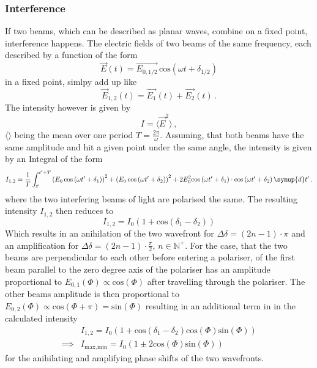 \subsubsection{Interference}
If two beams, which can be described as planar waves, combine on a fixed point, interference happens. The electric fields of two beams of the same frequency, each described by a function of the form 
\begin{equation}
    \vec{E}\left( t\right) = \vec{E_{0,1/2}} \, \text{cos} \left(\omega t + \delta_{1/2}\right)
\end{equation}
in a fixed point, simlpy add up like
\begin{equation}
    \vec{E}_{1,2}\left( t\right) = \vec{E_{1}}\left( t\right) + \vec{E_{2}}\left( t\right) \, .
\end{equation}
The intensity however is given by 
\begin{equation}
    I = \langle \vec{E}^2 \rangle \, ,
\end{equation}
$\langle \rangle$ being the mean over one period $T = \frac{2 \pi}{\omega}$. Assuming, that both beams have the same amplitude and hit a given point under the same angle, the intensity is given by an Integral of the form
\begin{equation}
    I_{1,2} = \frac{1}{T} \int_{t'}^{t' + T} \left( E_0 \, \text{cos}\left( \omega t' + \delta_1 \right) \right)^2 + \left( E_0 \, \text{cos}\left( \omega t' + \delta_2 \right) \right)^2 + 2 E_0^2 \text{cos}\left( \omega t' + \delta_1 \right) \cdot \text{cos}\left( \omega t' + \delta_2 \right) \symup{d}t' \, . 
\end{equation}
where the two interfering beams of light are polarised the same.
The resulting intensity $I_{1,2}$ then reduces to 
\begin{equation}
    I_{1,2} = I_0 \left( 1 + \text{cos}\left( \delta_1 - \delta_2 \right) \right)
\end{equation}
Which results in an anihilation of the two wavefront for $\Delta \delta = \left( 2n - 1 \right) \cdot \pi$ and an amplification for $\Delta \delta = \left( 2n - 1 \right) \cdot \frac{\pi}{2} $, $n \in \mathbb{N}^+$.
For the case, that the two beams are perpendicular to each other before entering a polariser, of the first beam parallel to the zero degree axis of the polariser has an amplitude proportional to $E_{0,1}\left(\Phi\right) \propto \text{cos}\left( \Phi \right)$ after travelling through the polariser. The other beams amplitude is then proportional to $E_{0,2}\left(\Phi\right) \propto \text{cos}\left( \Phi + \pi\right) = \text{sin}\left( \Phi \right)$ resulting in an additional term in in the calculated intensity
\begin{equation}
    \label{eqn:1}
    \begin{aligned}
        &I_{1,2} = I_0 \left( 1 + \text{cos}\left( \delta_1 - \delta_2 \right) \text{cos}\left(\Phi\right) \text{sin}\left(\Phi\right)\right) \\
        \implies &I_{\text{max,min}} = I_0 \left( 1 \pm 2\text{cos}\left(\Phi\right) \text{sin}\left(\Phi\right)\right)
    \end{aligned}
\end{equation}
for the anihilating and amplifying phase shifts of the two wavefronts.
